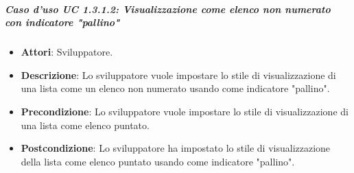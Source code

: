 \subparagraph{Caso d'uso UC 1.3.1.2: Visualizzazione come elenco non numerato con indicatore "pallino"}

\FloatBarrier
\begin{itemize}
\item\textbf{Attori}: Sviluppatore.
\item\textbf{Descrizione}: Lo sviluppatore vuole impostare lo stile di visualizzazione di una lista come un elenco non numerato usando come indicatore "pallino".
\item\textbf{Precondizione}: Lo sviluppatore vuole impostare lo stile di visualizzazione di una lista come elenco puntato.
\item\textbf{Postcondizione}: Lo sviluppatore ha impostato lo stile di visualizzazione della lista come elenco puntato usando come indicatore "pallino".
\end{itemize}

